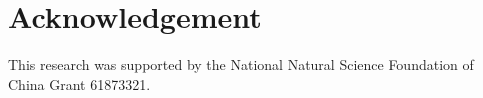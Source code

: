 \documentclass[journal,twocolumn]{IEEEtran}
\begin{document}
\section*{Acknowledgement}
This research was supported by the National Natural Science Foundation of China Grant 61873321.








\end{document}
